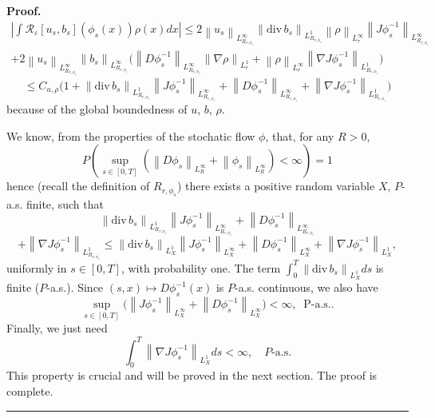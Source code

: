 \documentclass[a4paper,10pt]{article}
\newenvironment{proof}[1][Proof]{\textbf{#1.} }{\ \rule{0.5em}{0.5em}}
\begin{document}
\begin{proof}
\begin{align*}
\left|  \int\mathcal{R}_{\varepsilon}\left[  u_{s},b_{s}\right]
\left( {\phi}_{s}\left(  x\right)  \right)  \rho\left(  x\right)
dx\right| \leq2\left\|  u_{s}\right\|
_{L_{R_{r,{\phi}_{s}}}^{\infty}}\left\| {\mathrm{div}\,
}b_{s}\right\|  _{L_{R_{r,{\phi}_{s}}}^{1}}\left\| \rho\right\|
_{L_{r}^{\infty}}\left\|  J{\phi}_{s}^{-1}\right\|  _{L_{R_{r,{\phi}_{s}}%
}^{\infty}}\\
  +2\left\|  u_{s}\right\|  _{L_{R_{r,{\phi}_{s}}}^{\infty}}\left\|
b_{s}\right\|  _{L_{R_{r,{\phi}_{s}}}^{\infty}}\Big( \left\|
D\phi^{-1}_s
  \right\|_{L_{R_{r,\phi_s}}^{\infty}} \left\|
\nabla \rho\right\|  _{L_{r}^{1}}+\left\| \rho\right\| _{L_{r
}^{\infty}}\left\|  \nabla J{\phi}_{s}^{-1}\right\|  _{L_{R_{r,{\phi}_{s}}%
}^{1}}\Big)
\end{align*}
\[
\leq C_{u,\rho}\Big(  1+\left\|  {\mathrm{div}\, }b_{s}\right\|
_{L_{R_{r,{\phi }_{s}}}^{1}}\left\|  J{\phi}_{s}^{-1}\right\|
_{L_{R_{r,{\phi}_{s}}}^{\infty }}+ \left\| D\phi^{-1}_s
  \right\|_{L_{R_{r,\phi_s}}^{\infty}}
 + \left\|  \nabla J{\phi}_{s}^{-1}\right\|  _{L_{R_{r,{\phi}_{s}}}^{1}%
}\Big)
\]
because of the global boundedness of $u$, $b$, $\rho$.

We know, from the properties of the stochatic flow ${\phi}$, that,
for any $R>0$,
\[
P\left(  \sup_{s\in\left[  0,T\right]  }\left(  \left\|
D{\phi}_{s}\right\| _{L_{R}^{\infty}}+\left\|  {\phi}_{s}\right\|
_{L_{R}^{\infty}}\right) <\infty\right)  =1
\]
hence (recall the definition of $R_{r,{\phi}_{s}}$) there exists a positive
random variable $X$, $P$-a.s. finite, such that
\[
\left\|  {\mathrm{div}\, }b_{s}\right\|
_{L_{R_{r,{\phi}_{s}}}^{1}}\left\| J{\phi}_{s}^{-1}\right\|
_{L_{R_{r,{\phi}_{s}}}^{\infty}}+ \left\| D\phi^{-1}_s
  \right\|_{L_{R_{r,\phi_s}}^{\infty}}
 \] \[ +   \left\|  \nabla
J{\phi}_{s}^{-1}\right\|  _{L_{R_{r,{\phi}_{s}}}^{1}}\leq\left\|
{\mathrm{div}\, }b_{s}\right\|  _{L_{X}^{1}}\left\|
J{\phi}_{s}^{-1}\right\| _{L_{X}^{\infty}}+ \left\| D\phi^{-1}_s
  \right\|_{L_{X}^{\infty}}+
\left\|  \nabla J{\phi}_{s}^{-1}\right\|  _{L_{X}^{1}},
\]
uniformly in $s\in\left[  0,T\right]  $, with probability one. The
term $\int_{0}^{T}\left\|  {\mathrm{div}\, }b_{s}\right\|
_{L_{X}^{1}}ds$ is finite ($P$-a.s.). Since $\left(  s,x\right)
\mapsto D{\phi}_{s}^{-1}\left( x\right)  $ is $P$-a.s. continuous,
we also have
$$ \sup_{s\in\left[ 0,T\right]  } \Big( \left\|
J{\phi}_{s}^{-1}\right\|  _{L_{X}^{\infty}} +
 \left\| D\phi^{-1}_s
  \right\|_{L_{X}^{\infty}} \Big) <\infty,
\;\; \text{P-a.s..}
$$
Finally, we just need%
\begin{equation}
\int_{0}^{T}\left\|  \nabla J{\phi}_{s}^{-1}\right\|  _{L_{X}^{1}}%
ds<\infty,\quad P\text{-a.s.} \label{bound on DJ}%
\end{equation}
This property is crucial and will be proved in the next section.
The proof is complete.
\end{proof}
\end{document}
